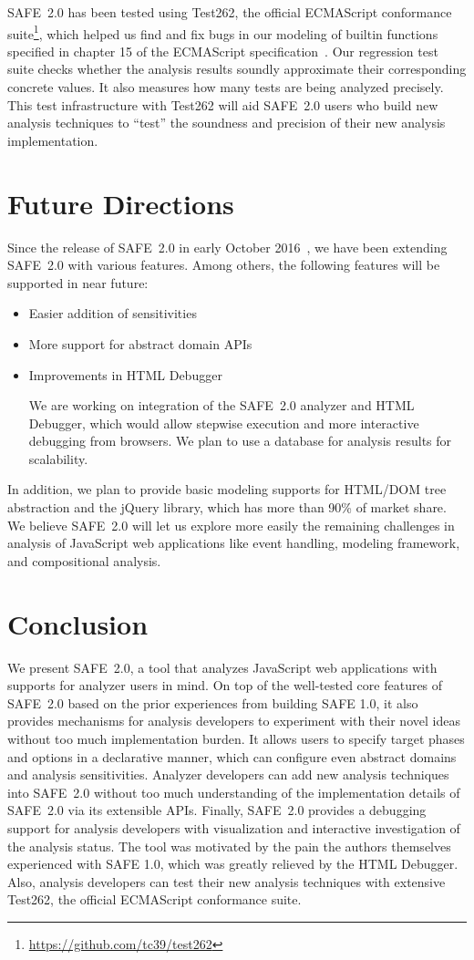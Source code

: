 \documentclass[10pt, conference]{IEEEtran}
\newcommand{\oldsafe}{{SAFE 1.0}\xspace}
\newcommand{\safe}{{SAFE~2.0}\xspace}
\newcommand{\htmldebug}{{\sf\small HTML Debugger}\xspace}
\begin{document}
\safe has been tested using Test262, the official ECMAScript
conformance suite\footnote{\url{https://github.com/tc39/test262}},
which helped us find and fix bugs in our modeling of builtin
functions specified in chapter 15 of the ECMAScript
specification~\cite{ECMA}.  Our regression test suite checks
whether the analysis results soundly approximate their corresponding
concrete values.  It also measures how many tests are being analyzed
precisely.  This test infrastructure with Test262 will aid \safe users
who build new analysis techniques to ``test'' the soundness and precision of their
new analysis implementation.


\section{Future Directions}
Since the release of \safe in early October 2016~\cite{saferelease},
we have been extending \safe with various features.
Among others, the following features will be supported in near future:
\begin{itemize}
\item Easier addition of sensitivities 
\item More support for abstract domain APIs
\item Improvements in \htmldebug

We are working on integration of the \safe analyzer and \htmldebug,
which would allow stepwise execution and more interactive debugging from browsers.
We plan to use a database for analysis results for scalability.
\end{itemize}
In addition, we plan to provide basic modeling supports for HTML/DOM
tree abstraction and the jQuery library, which has more than 90\% of
market share.  We believe \safe will let us explore more easily
the remaining challenges in analysis of JavaScript web applications
like event handling, modeling framework, and compositional analysis.


\section{Conclusion}
We present \safe, a tool that analyzes JavaScript web applications with
supports for analyzer users in mind.  On top of the well-tested core
features of \safe based on the prior experiences from building \oldsafe,
it also provides mechanisms for analysis developers to experiment with
their novel ideas without too much implementation burden.
It allows users to specify target phases and options in a declarative
manner, which can configure even abstract domains and analysis
sensitivities.  Analyzer developers can add new analysis techniques
into \safe without too much understanding of the implementation details
of \safe via its extensible APIs.  Finally, \safe provides a debugging
support for analysis developers with visualization and interactive
investigation of the analysis status.  The tool was motivated by the pain
the authors themselves experienced with \oldsafe, which was greatly
relieved by the \htmldebug.  Also, analysis developers can test their
new analysis techniques with extensive Test262, the official ECMAScript
conformance suite.



\end{document}
